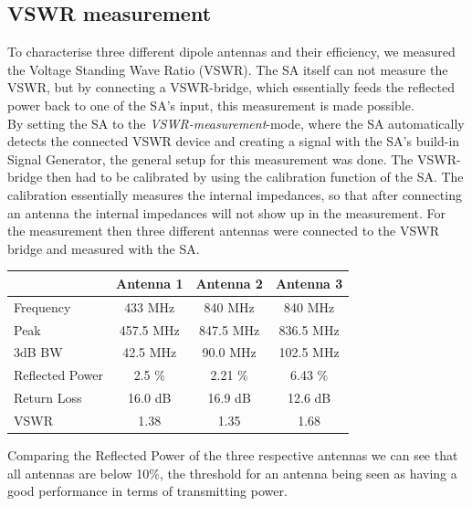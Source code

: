 \subsection{VSWR measurement}
To characterise three different dipole antennas and their efficiency, we measured the Voltage Standing Wave Ratio (VSWR). The SA itself can not measure the VSWR, but by connecting a VSWR-bridge, which essentially feeds the reflected power back to one of the SA's input, this measurement is made possible.\\
By setting the SA to the \textit{VSWR-measurement}-mode, where the SA automatically detects the connected VSWR device and creating a signal with the SA's build-in Signal Generator, the general setup for this measurement was done. The VSWR-bridge then had to be calibrated by using the calibration function of the SA. The calibration essentially measures the internal impedances, so that after connecting an antenna the internal impedances will not show up in the measurement. For the measurement then three different antennas were connected to the VSWR bridge and measured with the SA.



\begin{center}
\begin{tabular}{l | c | c | c }
	& \textbf{Antenna 1} & \textbf{Antenna 2} & \textbf{Antenna 3}\\
	\hline
	Frequency & 433 MHz & 840 MHz & 840 MHz\\ \hline
	Peak & 457.5 MHz & 847.5 MHz & 836.5 MHz\\ \hline
	3dB BW & 42.5 MHz & 90.0 MHz & 102.5 MHz\\ \hline
	Reflected Power & 2.5 \% & 2.21 \% & 6.43 \% \\ \hline
	Return Loss & 16.0 dB & 16.9 dB & 12.6 dB\\ \hline
	VSWR & 1.38 & 1.35 & 1.68\\ \hline
\end{tabular}
\label{tab:VSWR}
\end{center}

Comparing the Reflected Power of the three respective antennas we can see that all antennas are below 10\%, the threshold for an antenna being seen as having a good performance in terms of transmitting power.


